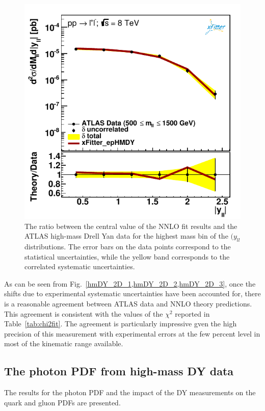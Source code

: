 \begin{figure}[t]
\centering
\includegraphics[width=16cm]{figs/data_405-1.pdf}
\caption{The ratio between the central value of the NNLO fit results
  and the ATLAS high-mass Drell Yan data
  for the highest mass bin of the $(y_{ll}$ distributions.
  The error bars on the data points correspond to the statistical
  uncertainties, while the yellow band
  corresponds to the correlated systematic uncertainties.
}
\label{hmDY_2D_3}
\end{figure}

As can be seen from Fig.~\ref{hmDY_2D_1,hmDY_2D_2,hmDY_2D_3}, once the shifts due to
experimental systematic uncertainties have been accounted for, there
is a reasonable agreement between ATLAS data and NNLO theory
predictions.
%
This agreement is consistent with the values of the $\chi^2$ reported in
Table~\ref{tab:chi2fit}. The agreement is particularly impressive gven 
the high precision of this measurement with experimental
errors at the few percent level in most of the kinematic range
available.


\subsection{The photon PDF from high-mass DY data}
%
The results for the photon PDF and the impact
of the DY measurements on the quark and gluon PDFs are presented.
%

